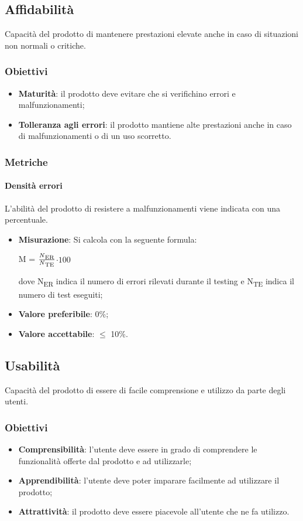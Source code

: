 	\subsection{Affidabilità}
	Capacità del prodotto di mantenere prestazioni elevate anche in caso di situazioni non normali o critiche.
		\subsubsection{Obiettivi}
		\begin{itemize}
			\item \textbf{Maturità}: il prodotto deve evitare che si verifichino errori e malfunzionamenti;
			\item \textbf{Tolleranza agli errori}: il prodotto mantiene alte prestazioni anche in caso di malfunzionamenti o di un uso scorretto.
		\end{itemize}
		\subsubsection{Metriche}
			\paragraph{Densità errori}
			L'abilità del prodotto di resistere a malfunzionamenti viene indicata con una percentuale.
			\begin{itemize}
			\item \textbf{Misurazione}: Si calcola con la seguente formula: \\
			\centerline{ M =  \(\frac{N\textsubscript{ER}}{N\textsubscript{TE}} \)$ \cdot 100$ }
			dove N\textsubscript{ER} indica il numero di errori rilevati durante il testing e N\textsubscript{TE} indica il numero di test eseguiti;
			\item\textbf{Valore preferibile}: 0\%;
			\item \textbf{Valore accettabile}: $\leq$ 10\%.
			\end{itemize}
	\subsection{Usabilità}
	Capacità del prodotto di essere di facile comprensione e utilizzo da parte degli utenti.
		\subsubsection{Obiettivi}
		\begin{itemize}
			\item \textbf{Comprensibilità}: l'utente deve essere in grado di comprendere le funzionalità offerte dal prodotto e ad utilizzarle;
			\item \textbf{Apprendibilità}: l'utente deve poter imparare facilmente ad utilizzare il prodotto;
			\item \textbf{Attrattività}: il prodotto deve essere piacevole all'utente che ne fa utilizzo.
		\end{itemize}
